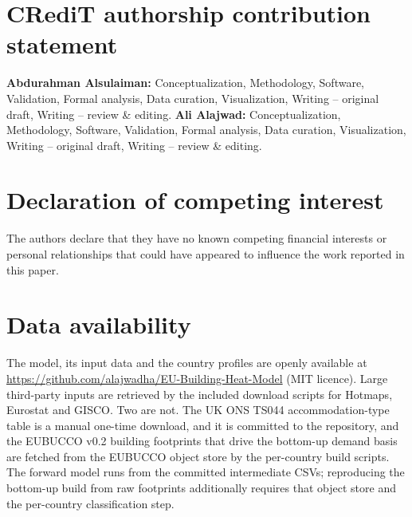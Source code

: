 \documentclass[review]{elsarticle}
\begin{document}





\section*{CRediT authorship contribution statement}
\textbf{Abdurahman Alsulaiman:} Conceptualization, Methodology, Software, Validation, Formal analysis, Data curation, Visualization, Writing -- original draft, Writing -- review \& editing. \textbf{Ali Alajwad:} Conceptualization, Methodology, Software, Validation, Formal analysis, Data curation, Visualization, Writing -- original draft, Writing -- review \& editing.

\section*{Declaration of competing interest}
The authors declare that they have no known competing financial interests or personal relationships that could have appeared to influence the work reported in this paper.

%

\section*{Data availability}
The model, its input data and the country profiles are openly available at \url{https://github.com/alajwadha/EU-Building-Heat-Model} (MIT licence). Large third-party inputs are retrieved by the included download scripts for Hotmaps, Eurostat and GISCO. Two are not. The UK ONS TS044 accommodation-type table is a manual one-time download, and it is committed to the repository, and the EUBUCCO v0.2 building footprints that drive the bottom-up demand basis are fetched from the EUBUCCO object store by the per-country build scripts. The forward model runs from the committed intermediate CSVs; reproducing the bottom-up build from raw footprints additionally requires that object store and the per-country classification step.
\end{document}
